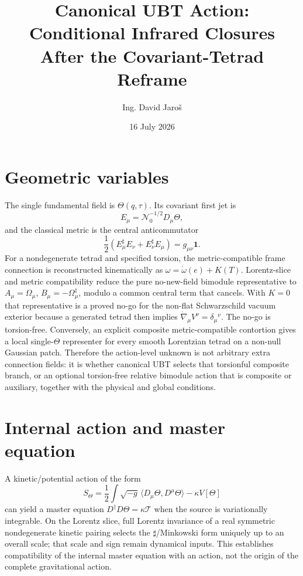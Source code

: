 \documentclass[11pt,a4paper]{article}
\title{Canonical UBT Action: Conditional Infrared Closures After the Covariant-Tetrad Reframe}
\author{Ing. David Jaro\v{s}}
\date{16 July 2026}
\begin{document}
\maketitle

\section{Geometric variables}
The single fundamental field is $\Theta(q,\tau)$.  Its covariant first jet is
\[
 E_\mu=\mathcal N_0^{-1/2}D_\mu\Theta,
\]
and the classical metric is the central anticommutator
\[
 \frac12(E_\mu^\sharp E_\nu+E_\nu^\sharp E_\mu)=g_{\mu\nu}\mathbf1.
\]
For a nondegenerate tetrad and specified torsion, the metric-compatible frame
connection is reconstructed kinematically as
$\omega=\mathring\omega(e)+K(T)$.  Lorentz-slice and metric compatibility
reduce the pure no-new-field bimodule representative to
$A_\mu=\Omega_\mu$, $B_\mu=-\Omega_\mu^\ddagger$, modulo a common central term
that cancels.  With $K=0$ that representative is a proved no-go for the
non-flat Schwarzschild vacuum exterior because a generated tetrad then implies
$\mathring\nabla_\mu V^\nu=\delta_\mu{}^\nu$.  The no-go is torsion-free.
Conversely, an explicit composite metric-compatible contortion gives a local
single-$\Theta$ representer for every smooth Lorentzian tetrad on a non-null
Gaussian patch.  Therefore the action-level unknown is not arbitrary extra
connection fields: it is whether canonical UBT selects that torsionful
composite branch, or an optional torsion-free relative bimodule action that is
composite or auxiliary, together with the physical and global conditions.

\section{Internal action and master equation}
A kinetic/potential action of the form
\[
 S_{\Theta}=\frac12\int\sqrt{-g}\,\langle D_\mu\Theta,D^\mu\Theta\rangle
 -\kappa V[\Theta]
\]
can yield a master equation $D^\dagger D\Theta=\kappa\mathcal T$ when the source
is variationally integrable.  On the Lorentz slice, full Lorentz invariance of
a real symmetric nondegenerate kinetic pairing selects the $\sharp$/Minkowski
form uniquely up to an overall scale; that scale and sign remain dynamical
inputs.  This establishes compatibility of the internal master equation with
an action, not the origin of the complete gravitational action.
\end{document}
